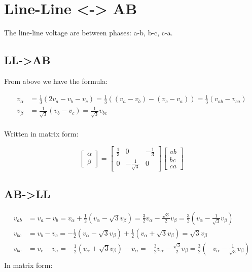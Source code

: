 \documentclass[]{book}
\begin{document}
\hypertarget{line-line---ab}{%
\section{Line-Line \textless{}-\textgreater{} AB}\label{line-line---ab}}

The line-line voltage are between phases: a-b, b-c, c-a.

\hypertarget{ll-ab}{%
\subsection{LL-\textgreater{}AB}\label{ll-ab}}

From above we have the formula:

\[
\begin{aligned}
v_\alpha &=  \frac{1}{3} ( 2 v_a - v_b-v_c) = \frac{1}{3} ( (v_a - v_b)-(v_c-v_a))= \frac{1}{3} ( v_{ab} - v_{ca})   \\
v_\beta &=   \frac{1}{\sqrt{3}} (v_b-v_c) = \frac{1}{\sqrt{3}} v_{bc}   \\
\end{aligned}
\label{eq:abcAB1}
\]

Written in matrix form:

\[
\begin{bmatrix} \alpha\\ \beta \end{bmatrix}
= \begin{bmatrix} \frac{1}{3} & 0 & -\frac{1}{3} \\ 0  & -\frac{1}{\sqrt{3}} & 0 \end{bmatrix}
\begin{bmatrix} ab\\ bc \\ ca \end{bmatrix}
\label{eq:abcABmat2}
\]

\hypertarget{ab-ll}{%
\subsection{AB-\textgreater{}LL}\label{ab-ll}}

\[
\begin{aligned}
v_{ab} &=  v_a - v_b =v_\alpha + \frac{1}{2}(v_\alpha -\sqrt{3}v_\beta)
=\frac{3}{2}v_\alpha - \frac{\sqrt{3}}{2}v_\beta 
=\frac{3}{2} (v_\alpha - \frac{1}{\sqrt{3}}v_\beta  )  \\
v_{bc} &=  v_b - v_c =  - \frac{1}{2}(v_\alpha -\sqrt{3}v_\beta)+ \frac{1}{2}(v_\alpha +\sqrt{3}v_\beta) = \sqrt{3}v_\beta  \\
v_{bc} &=  v_c - v_a =  - \frac{1}{2}(v_\alpha +\sqrt{3}v_\beta) - v_\alpha 
= -\frac{3}{2}v_\alpha - \frac{\sqrt{3}}{2}v_\beta =\frac{3}{2} (-v_\alpha - \frac{1}{\sqrt{3}}v_\beta  )  \\
\end{aligned}
\label{eq:AB2LL}
\]
In matrix form:
\end{document}
